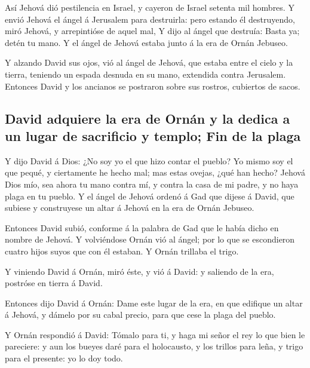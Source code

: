  Así Jehová dió pestilencia en Israel, y cayeron de
Israel setenta mil hombres.  Y envió Jehová el ángel á
Jerusalem para destruirla: pero estando él destruyendo, miró Jehová, y
arrepintióse de aquel mal,  Y dijo al ángel que destruía:
Basta ya; detén tu mano. Y el ángel de Jehová estaba junto á la era de
Ornán Jebuseo.

 Y alzando David sus ojos, vió al ángel de Jehová, que
estaba entre el cielo y la tierra, teniendo un espada desnuda en su
mano, extendida contra Jerusalem. Entonces David y los ancianos se
postraron sobre sus rostros, cubiertos de sacos.

\hypertarget{david-adquiere-la-era-de-ornuxe1n-y-la-dedica-a-un-lugar-de-sacrificio-y-templo-fin-de-la-plaga}{%
\subsection{David adquiere la era de Ornán y la dedica a un lugar de
sacrificio y templo; Fin de la
plaga}\label{david-adquiere-la-era-de-ornuxe1n-y-la-dedica-a-un-lugar-de-sacrificio-y-templo-fin-de-la-plaga}}

 Y dijo David á Dios: ¿No soy yo el que hizo contar el
pueblo? Yo mismo soy el que pequé, y ciertamente he hecho mal; mas estas
ovejas, ¿qué han hecho? Jehová Dios mío, sea ahora tu mano contra mí, y
contra la casa de mi padre, y no haya plaga en tu pueblo.
 Y el ángel de Jehová ordenó á Gad que dijese á David,
que subiese y construyese un altar á Jehová en la era de Ornán Jebuseo.

 Entonces David subió, conforme á la palabra de Gad que
le había dicho en nombre de Jehová.  Y volviéndose Ornán
vió al ángel; por lo que se escondieron cuatro hijos suyos que con él
estaban. Y Ornán trillaba el trigo.

 Y viniendo David á Ornán, miró éste, y vió á David: y
saliendo de la era, postróse en tierra á David.

 Entonces dijo David á Ornán: Dame este lugar de la era,
en que edifique un altar á Jehová, y dámelo por su cabal precio, para
que cese la plaga del pueblo.

 Y Ornán respondió á David: Tómalo para ti, y haga mi
señor el rey lo que bien le pareciere: y aun los bueyes daré para el
holocausto, y los trillos para leña, y trigo para el presente: yo lo doy
todo.

